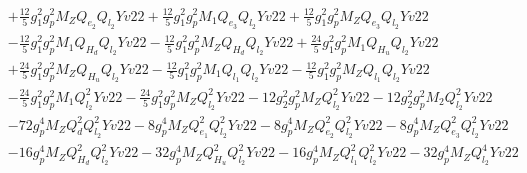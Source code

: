 \begin{align}
 &+\frac{12}{5} g_{1}^{2} g_{p}^{2} M_Z Q_{e_{2}} Q_{l_2} Yv22 +\frac{12}{5} g_{1}^{2} g_{p}^{2} M_1 Q_{e_3} Q_{l_2} Yv22 +\frac{12}{5} g_{1}^{2} g_{p}^{2} M_Z Q_{e_3} Q_{l_2} Yv22 \nonumber \\ 
 &-\frac{12}{5} g_{1}^{2} g_{p}^{2} M_1 Q_{H_d} Q_{l_2} Yv22 -\frac{12}{5} g_{1}^{2} g_{p}^{2} M_Z Q_{H_d} Q_{l_2} Yv22 +\frac{24}{5} g_{1}^{2} g_{p}^{2} M_1 Q_{H_u} Q_{l_2} Yv22 \nonumber \\ 
 &+\frac{24}{5} g_{1}^{2} g_{p}^{2} M_Z Q_{H_u} Q_{l_2} Yv22 -\frac{12}{5} g_{1}^{2} g_{p}^{2} M_1 Q_{l_1} Q_{l_2} Yv22 -\frac{12}{5} g_{1}^{2} g_{p}^{2} M_Z Q_{l_1} Q_{l_2} Yv22 \nonumber \\ 
 &-\frac{24}{5} g_{1}^{2} g_{p}^{2} M_1 Q_{l_2}^{2} Yv22 -\frac{24}{5} g_{1}^{2} g_{p}^{2} M_Z Q_{l_2}^{2} Yv22 -12 g_{2}^{2} g_{p}^{2} M_Z Q_{l_2}^{2} Yv22 -12 g_{2}^{2} g_{p}^{2} M_2 Q_{l_2}^{2} Yv22 \nonumber \\ 
 &-72 g_{p}^{4} M_Z Q_{d}^{2} Q_{l_2}^{2} Yv22 -8 g_{p}^{4} M_Z Q_{e_{1}}^{2} Q_{l_2}^{2} Yv22 -8 g_{p}^{4} M_Z Q_{e_{2}}^{2} Q_{l_2}^{2} Yv22 -8 g_{p}^{4} M_Z Q_{e_3}^{2} Q_{l_2}^{2} Yv22 \nonumber \\ 
 &-16 g_{p}^{4} M_Z Q_{H_d}^{2} Q_{l_2}^{2} Yv22 -32 g_{p}^{4} M_Z Q_{H_u}^{2} Q_{l_2}^{2} Yv22 -16 g_{p}^{4} M_Z Q_{l_1}^{2} Q_{l_2}^{2} Yv22 -32 g_{p}^{4} M_Z Q_{l_2}^{4} Yv22 \nonumber 
\end{align} 
